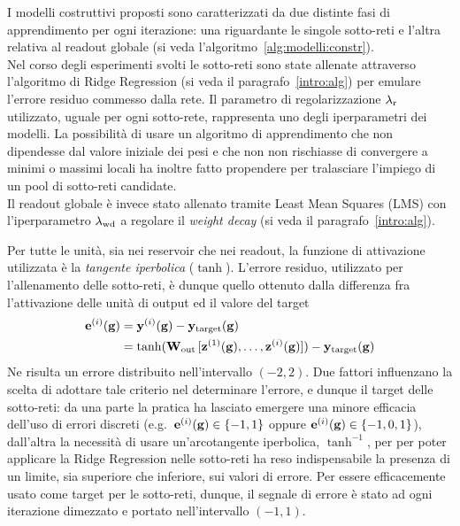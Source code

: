 I modelli costruttivi proposti sono caratterizzati da due distinte fasi di apprendimento per ogni iterazione: una riguardante le singole sotto-reti e l'altra relativa al readout globale (si veda l'algoritmo~\vref{alg:modelli:constr}).\\
Nel corso degli esperimenti svolti le sotto-reti sono state allenate attraverso l'algoritmo di Ridge Regression (si veda il paragrafo~\ref{intro:alg}) per emulare l'errore residuo commesso dalla rete. Il parametro di regolarizzazione $\lambda_\textup{r}$ utilizzato, uguale per ogni sotto-rete, rappresenta uno degli iperparametri dei modelli. La possibilità di usare un algoritmo di apprendimento che non dipendesse dal valore iniziale dei pesi e che non non rischiasse di convergere a minimi o massimi locali ha inoltre fatto propendere per tralasciare l'impiego di un pool di sotto-reti candidate.\\
Il readout globale è invece stato allenato tramite Least Mean Squares (LMS) con l'iperparametro $\lambda_\textup{wd}$ a regolare il \textit{weight decay} (si veda il paragrafo~\ref{intro:alg}).

Per tutte le unità, sia nei reservoir che nei readout, la funzione di attivazione utilizzata è la \emph{tangente iperbolica} ($\tanh$). L'errore residuo, utilizzato per l'allenamento delle sotto-reti, è dunque quello ottenuto dalla differenza fra l'attivazione delle unità di output ed il valore del target
\begin{equation}
\begin{split}
\vect{e}^{(i)}(\graph{g}) 
	&= \vect{y}^{(i)}(\graph{g}) - \vect{y}_\textup{target}(\graph{g}) \\
	&= \tanh( \matr{W}_\textup{out} \, [\vect{z}^{(1)}(\graph{g}), \dots, \vect{z}^{(i)}(\graph{g})] ) - 
		\vect{y}_\textup{target}(\graph{g})
\end{split}
\end{equation}
Ne risulta un errore distribuito nell'intervallo $(-2, 2)$. Due fattori influenzano la scelta di adottare tale criterio nel determinare l'errore, e dunque il target delle sotto-reti: da una parte la pratica ha lasciato emergere una minore efficacia dell'uso di errori discreti (e.g.\ $\mathbf{e}^{(i)}(\mathbf{g}) \in \lbrace -1, 1 \rbrace$ oppure $\mathbf{e}^{(i)}(\mathbf{g}) \in \lbrace -1, 0, 1 \rbrace$), dall'altra la necessità di usare un'arcotangente iperbolica, $\tanh^{-1}$, per per poter applicare la Ridge Regression nelle sotto-reti ha reso indispensabile la presenza di un limite, sia superiore che inferiore, sui valori di errore. Per essere efficacemente usato come target per le sotto-reti, dunque, il segnale di errore è stato ad ogni iterazione dimezzato e portato nell'intervallo $(-1,1)$.

